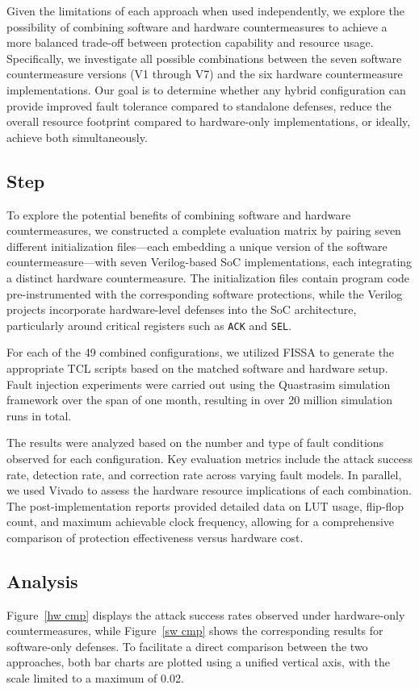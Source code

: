 Given the limitations of each approach when used independently, we explore the possibility of combining software and hardware countermeasures to achieve a more balanced trade-off between protection capability and resource usage. Specifically, we investigate all possible combinations between the seven software countermeasure versions (V1 through V7) and the six hardware countermeasure implementations. Our goal is to determine whether any hybrid configuration can provide improved fault tolerance compared to standalone defenses, reduce the overall resource footprint compared to hardware-only implementations, or ideally, achieve both simultaneously.

\subsection{Step}
To explore the potential benefits of combining software and hardware countermeasures, we constructed a complete evaluation matrix by pairing seven different initialization files—each embedding a unique version of the software countermeasure—with seven Verilog-based SoC implementations, each integrating a distinct hardware countermeasure. The initialization files contain program code pre-instrumented with the corresponding software protections, while the Verilog projects incorporate hardware-level defenses into the SoC architecture, particularly around critical registers such as \texttt{ACK} and \texttt{SEL}.

For each of the 49 combined configurations, we utilized FISSA to generate the appropriate TCL scripts based on the matched software and hardware setup. Fault injection experiments were carried out using the Quastrasim simulation framework over the span of one month, resulting in over 20 million simulation runs in total.

The results were analyzed based on the number and type of fault conditions observed for each configuration. Key evaluation metrics include the attack success rate, detection rate, and correction rate across varying fault models. In parallel, we used Vivado to assess the hardware resource implications of each combination. The post-implementation reports provided detailed data on LUT usage, flip-flop count, and maximum achievable clock frequency, allowing for a comprehensive comparison of protection effectiveness versus hardware cost.

\subsection{Analysis}
Figure~\ref{hw cmp} displays the attack success rates observed under hardware-only countermeasures, while Figure~\ref{sw cmp} shows the corresponding results for software-only defenses. To facilitate a direct comparison between the two approaches, both bar charts are plotted using a unified vertical axis, with the scale limited to a maximum of 0.02.

